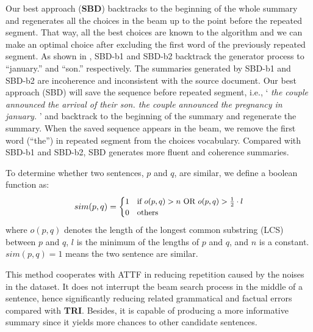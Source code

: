 Our best approach (\textbf{SBD}) backtracks to the beginning of the whole summary
and regenerates all the choices in the beam up to the point before
the repeated segment. That way, all the best choices are known to the
algorithm and we can make an optimal choice after excluding the first word
of the previously repeated segment. 
As shown in ,
SBD-b1 and SBD-b2 backtrack the generator process
to ``january.'' and ``son.'' respectively.
The summaries generated by SBD-b1 and SBD-b2 
are incoherence and inconsistent with the source document.
Our best approach (SBD) will save the sequence before repeated segment, i.e., 
`\textit{
the couple announced the arrival of their son.
the couple announced the pregnancy in january.}
'
and backtrack to the beginning of the summary and regenerate the summary. 
When the saved sequence appears in the beam, we remove the first word (``the'') in 
repeated segment from the choices vocabulary. 
Compared with SBD-b1 and SBD-b2, SBD generates more fluent and coherence summaries.


To determine whether two sentences, 
$p$ and $q$, are similar, we define a boolean function as:
\begin{equation}\label{eq:s}
\small
	sim(p,q) = 
	\begin{cases}
		   1 &\mbox{if $o(p,q) > n\text{ OR }o(p,q) > \frac{1}{2}\cdot l$}\\
		   0 &\mbox{others}
   \end{cases}
\end{equation}
where $o(p,q)$ denotes the length of 
the longest common substring (LCS) between $p$ and $q$, 
$l$ is the minimum of the lengths of $p$ and $q$, and $n$ is a constant. 
$sim(p,q)=1$ means the two sentence are similar.

This method cooperates with ATTF in 
reducing repetition caused by the noises in the dataset.
It does not interrupt the beam search process in the middle of a sentence, 
hence significantly reducing related grammatical and factual errors 
compared with \textbf{TRI}.
Besides, it is capable of producing a more informative summary since
it yields more chances to other candidate sentences.
